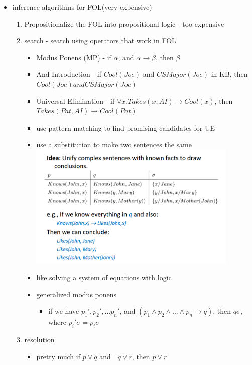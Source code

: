 \documentclass[11pt]{article}
\newcommand{\ee}[1]{\ensuremath{#1}}
\begin{document}
\begin{description}
\begin{itemize}
\begin{itemize}
		\item inference algorithms for FOL(very expensive)
		\begin{enumerate}
			\item Propositionalize the FOL into propositional logic - too expensive
			
			\item search - search using operators that work in FOL
			\begin{itemize}
				\item Modus Ponens (MP) - if \ee{\alpha}, and \ee{\alpha \rightarrow \beta}, then \ee{\beta}
				\item And-Introduction - if \ee{Cool(Joe)} and \ee{CSMajor(Joe)} in KB, then \ee{Cool(Joe) and CSMajor(Joe)}
				\item Universal Elimination - if \ee{\forall x. Takes(x, AI) \rightarrow Cool(x)}, then \ee{Takes(Pat,AI) \rightarrow Cool(Pat)}
				
				\item use pattern matching to find promising candidates for UE
				\item use a substitution to make two sentences the same
				\\ \includegraphics[width=100mm,scale=1]{unification}
				\item like solving a system of equations with logic
				
				\item generalized modus ponens
				\begin{itemize}
					\item if we have \ee{p_1', p_2',...p_n'}, and \ee{(p_1 \wedge p_2 \wedge ... \wedge p_n \rightarrow q)}, then \ee{q\sigma}, where \ee{p_i'\sigma = p_i \sigma}
				\end{itemize}
				
			\end{itemize}
		
			\item resolution
			\begin{itemize}
				\item pretty much if \ee{p \vee q} and \ee{\lnot q \vee r}, then \ee{p \vee r}
	
			\end{itemize}
	
		\end{enumerate}

		
		
	
		
	\end{itemize}
\end{itemize}

\end{description}
\end{document}
